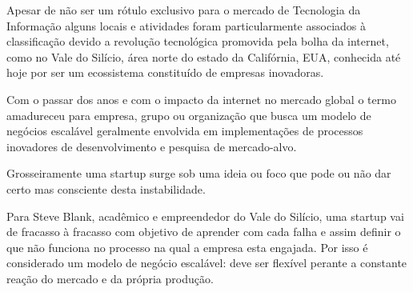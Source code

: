 \par Apesar de não ser um rótulo exclusivo para o mercado de Tecnologia da Informação alguns locais e atividades foram particularmente associados à classificação devido a revolução tecnológica promovida pela bolha da internet, como no Vale do Silício, área norte do estado da Califórnia, EUA, conhecida até hoje por ser um ecossistema constituído de empresas inovadoras.
\par Com o passar dos anos e com o impacto da internet no mercado global o termo amadureceu para empresa, grupo ou organização que busca um modelo de negócios escalável geralmente envolvida em implementações de processos inovadores de desenvolvimento e pesquisa de mercado-alvo.
\par Grosseiramente uma startup surge sob uma ideia ou foco que pode ou não dar certo mas consciente desta instabilidade.
\par Para Steve Blank, acadêmico e empreendedor do Vale do Silício, uma startup vai de fracasso à fracasso com objetivo de aprender com cada falha e assim definir o que não funciona no processo na qual a empresa esta engajada. Por isso é considerado um modelo de negócio escalável: deve ser flexível perante a constante reação do mercado e da própria produção.


